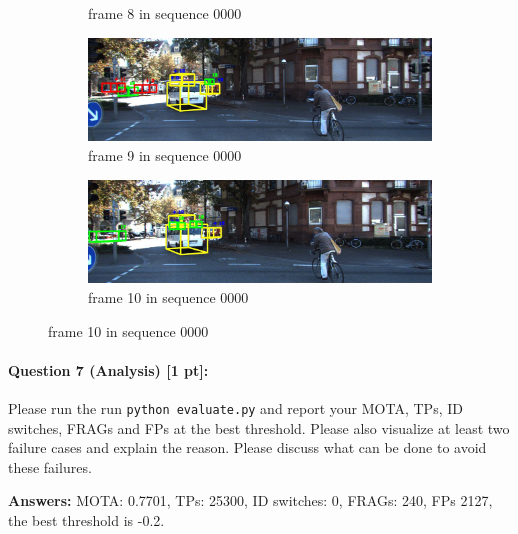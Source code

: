 \documentclass[11pt]{article}
\begin{document}
\begin{figure}[h]
\begin{subfigure}[b]{0.4\textwidth}
        \caption{frame 8 in sequence 0000}
    \end{subfigure}
    \hfill
    \begin{subfigure}[b]{0.4\textwidth}
        \includegraphics[width=\textwidth]{./fig/Q6_9.jpg}
        \caption{frame 9 in sequence 0000}
    \end{subfigure}
    \hfill
    \begin{subfigure}[b]{0.4\textwidth}
        \includegraphics[width=\textwidth]{./fig/Q6_10.jpg}
        \caption{frame 10 in sequence 0000}
    \end{subfigure}
\end{figure}

\paragraph{Question 7 (Analysis) [1 pt]:}
Please run the run \texttt{python evaluate.py} and report your MOTA, TPs, ID switches, FRAGs and FPs at the best threshold. Please also visualize at least two failure cases and explain the reason. Please discuss what can be done to avoid these failures.  

\textbf{Answers:} MOTA: 0.7701, TPs: 25300, ID switches: 0, FRAGs: 240, FPs 2127, the best threshold is -0.2.
\end{document}
